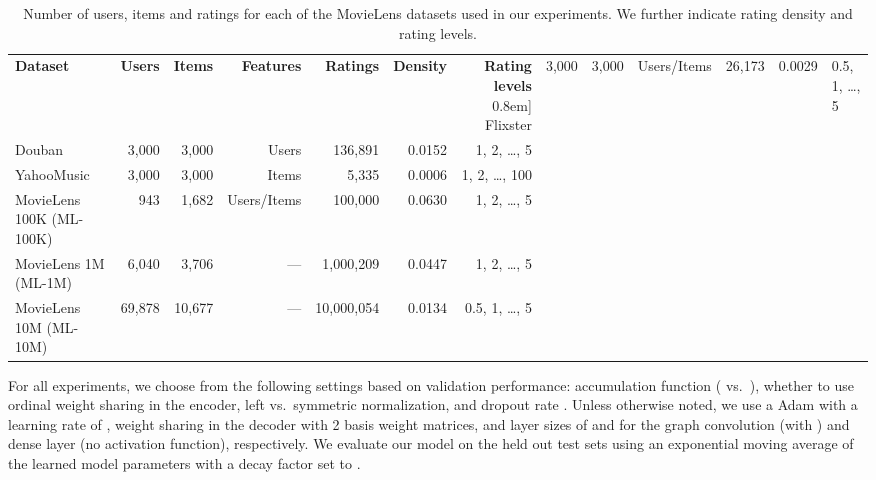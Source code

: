 \documentclass[twoside]{article}
\begin{document}
\begin{table*}[ht]
\centering
\begin{tabular}{lrrrrrr}
\toprule
\textbf{Dataset} & \textbf{Users} & \textbf{Items} & \textbf{Features} & \textbf{Ratings} & \textbf{Density} & \textbf{Rating levels} 
\-0.8em]
Flixster  & 3,000  & 3,000 & Users/Items & 26,173 & 0.0029 & 0.5, 1, \ldots, 5\\
Douban  & 3,000  & 3,000 & Users & 136,891 & 0.0152 & 1, 2, \ldots, 5\\
YahooMusic  & 3,000  & 3,000 & Items  & 5,335 & 0.0006 & 1, 2, \ldots, 100\\
MovieLens 100K (ML-100K)  & 943  & 1,682  & Users/Items & 100,000 & 0.0630 & 1, 2, \ldots, 5\\
MovieLens 1M (ML-1M)    & 6,040  & 3,706 & ---  & 1,000,209 & 0.0447& 1, 2, \ldots, 5 \\
MovieLens 10M (ML-10M)   & 69,878 & 10,677 & --- & 10,000,054 & 0.0134& 0.5, 1, \ldots, 5  \\ \hline 
\end{tabular}
\caption{Number of users, items and ratings for each of the MovieLens datasets used in our experiments. We further indicate rating density and rating levels.}
\label{table:datasets}
\end{table*}
For all experiments, we choose from the following settings based on validation performance: accumulation function ( vs.~), whether to use ordinal weight sharing in the encoder, left vs.~symmetric normalization, and dropout rate . Unless otherwise noted, we use a Adam \cite{kingma2014adam} with a learning rate of , weight sharing in the decoder with 2 basis weight matrices, and layer sizes of  and  for the graph convolution (with ) and dense layer (no activation function), respectively. We evaluate our model on the held out test sets using an exponential moving average of the learned model parameters with a decay factor set to .
\end{document}
